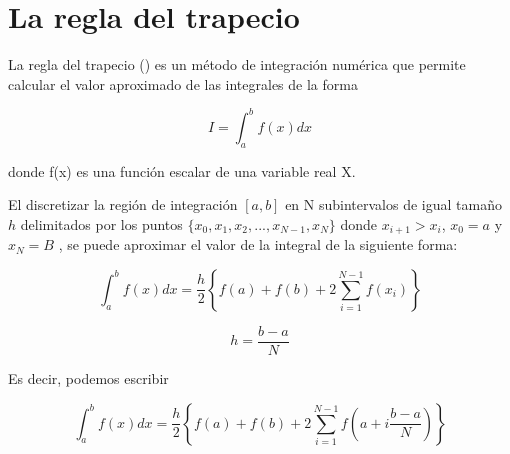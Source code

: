 \section{La regla del trapecio}

\vspace{0.5cm}

La regla del trapecio (\cite{nakamura1993applied}) es un método de integración numérica que permite calcular el valor aproximado de las integrales de la forma

\begin{equation*}
    I = \displaystyle\int_{a}^{b} f(x)dx
\end{equation*}

\noindent donde f(x) es una función escalar de una variable real X.

El discretizar la región de integración $ \left[ a,b \right] $ en N subintervalos de igual tamaño $h$ delimitados por los puntos $ \{ x_{0}, x_{1}, x_{2}, ..., x_{N-1}, x_N \} $ donde $x_{i+1} > x_{i}$, $x_0=a$ y $x_N = B$ , se puede aproximar el valor de la integral de la siguiente forma:

\begin{equation}
    \displaystyle\int_{a}^{b} f(x) dx = 
    \frac{h}{2} \left\{ 
    f(a) + f(b) + 2\displaystyle\sum_{i=1}^{N-1} f(x_i) 
    \right\}
\end{equation}

\begin{equation}
    h = \frac{b-a}{N}
\end{equation}

Es decir, podemos escribir

\begin{equation}
    \displaystyle\int_{a}^{b} f(x) dx = 
    \frac{h}{2} \left\{ 
    f(a) + f(b) + 2\displaystyle\sum_{i=1}^{N-1} f(a + i \frac{b-a}{N})
    \right\}
\end{equation}